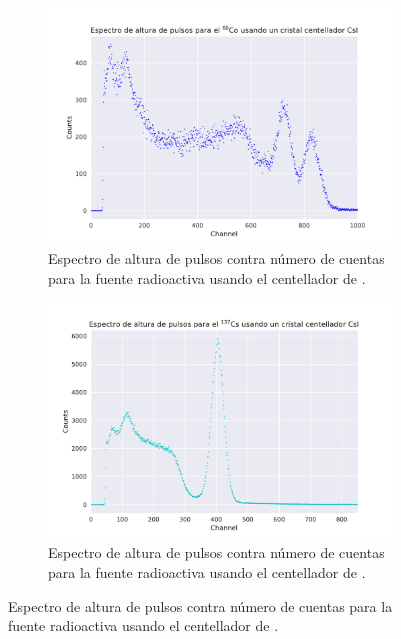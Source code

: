 \documentclass[12pt]{article}
\begin{document}
        \begin{figure}[!htb]
            \centering
            \captionsetup[subfigure]{font=small, width=.8\linewidth}%
            \begin{subfigure}{.5\textwidth}
                \centering
                \includegraphics[width=\textwidth, trim={1cm 0 1cm 0}, clip]{height_spectrum_CsI_60Co.pdf}
                \caption{Espectro de altura de pulsos contra número de cuentas para la fuente radioactiva  usando el centellador de .}
                \label{fig:HeightPulseCoCsI}
            \end{subfigure}%
            \begin{subfigure}{.5\textwidth}
                \centering
                \includegraphics[width=\textwidth, trim={1cm 0 1cm 0}, clip]{height_spectrum_CsI_137Cs.pdf}
                \caption{Espectro de altura de pulsos contra número de cuentas para la fuente radioactiva  usando el centellador de .}

\end{subfigure}
\end{figure}
\end{document}
